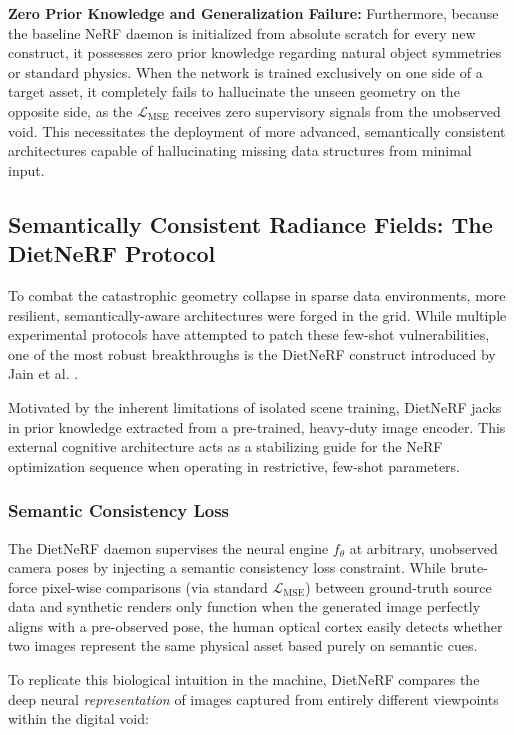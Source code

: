 \textbf{Zero Prior Knowledge and Generalization Failure:} 
Furthermore, because the baseline NeRF daemon is initialized from absolute scratch for every new construct, it possesses zero prior knowledge regarding natural object symmetries or standard physics. When the network is trained exclusively on one side of a target asset, it completely fails to hallucinate the unseen geometry on the opposite side, as the $\mathcal{L}_{\text{MSE}}$ receives zero supervisory signals from the unobserved void. This necessitates the deployment of more advanced, semantically consistent architectures capable of hallucinating missing data structures from minimal input.

\subsection{Semantically Consistent Radiance Fields: The DietNeRF Protocol}
To combat the catastrophic geometry collapse in sparse data environments, more resilient, semantically-aware architectures were forged in the grid. While multiple experimental protocols have attempted to patch these few-shot vulnerabilities, one of the most robust breakthroughs is the DietNeRF construct introduced by Jain et al. \cite{jain2021dietnerf}. 

Motivated by the inherent limitations of isolated scene training, DietNeRF jacks in prior knowledge extracted from a pre-trained, heavy-duty image encoder. This external cognitive architecture acts as a stabilizing guide for the NeRF optimization sequence when operating in restrictive, few-shot parameters.

\subsubsection{Semantic Consistency Loss}
The DietNeRF daemon supervises the neural engine $f_\theta$ at arbitrary, unobserved camera poses by injecting a semantic consistency loss constraint. While brute-force pixel-wise comparisons (via standard $\mathcal{L}_{\text{MSE}}$) between ground-truth source data and synthetic renders only function when the generated image perfectly aligns with a pre-observed pose, the human optical cortex easily detects whether two images represent the same physical asset based purely on semantic cues. 

To replicate this biological intuition in the machine, DietNeRF compares the deep neural \textit{representation} of images captured from entirely different viewpoints within the digital void:

